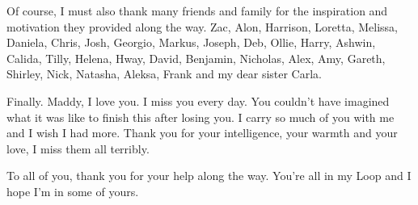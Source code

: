 Of course, I must also thank many friends and family for the inspiration and motivation they provided along the way. Zac, Alon, Harrison, Loretta, Melissa, Daniela, Chris, Josh, Georgio, Markus, Joseph, Deb, Ollie, Harry, Ashwin, Calida, Tilly, Helena, Hway, David, Benjamin, Nicholas, Alex, Amy, Gareth, Shirley, Nick, Natasha, Aleksa, Frank and my dear sister Carla.

Finally. Maddy, I love you. I miss you every day. You couldn't have imagined what it was like to finish this after losing you. I carry so much of you with me and I wish I had more. Thank you for your intelligence, your warmth and your love, I miss them all terribly.

To all of you, thank you for your help along the way. You're all in my Loop \cite{hofstadter2007} and I hope I'm in some of yours.
